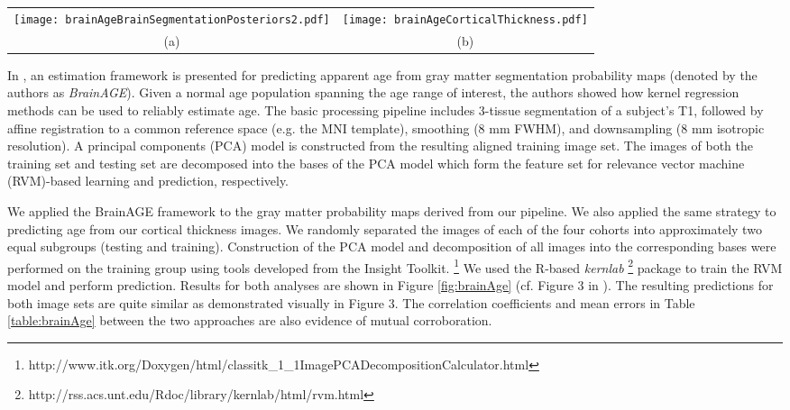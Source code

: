\begin{figure*}
  \centering
  \begin{tabular}{cc}
  \texttt{[image: brainAgeBrainSegmentationPosteriors2.pdf]} &
  \texttt{[image: brainAgeCorticalThickness.pdf]} \\
  (a) & (b) 
  \end{tabular}
  \caption{Results of RVM-based age prediction using (a) gray matter probability
  maps as in \cite{franke2010} and (b) cortical thickness maps both of which
  are derived from the previously described workflow.}
  \label{fig:brainAge}
\end{figure*}

In \cite{franke2010}, an estimation framework is presented for predicting 
apparent age from gray matter segmentation probability maps (denoted by the authors as {\it BrainAGE}).  
Given a normal age population spanning the age range of interest, the authors showed
how kernel regression methods can be used to reliably estimate age.  The basic processing pipeline includes 3-tissue segmentation
of a subject's T1, followed by affine registration to a common reference space (e.g.
the MNI template), smoothing (8 mm FWHM), and downsampling (8 mm 
isotropic resolution).  A principal components (PCA) model is constructed 
from the resulting aligned training image set.  The images of both the training set and 
testing set are decomposed into the bases of the PCA model which form the feature
set for relevance vector machine (RVM)-based learning and prediction, respectively. 

We applied the BrainAGE framework to the gray matter probability maps derived
from our pipeline.  We also applied the same strategy to predicting age from 
our cortical thickness images.  We randomly separated the images of each of the 
four cohorts into approximately two equal subgroups (testing and training).
Construction of the PCA model and decomposition of all images into the corresponding 
bases were performed on the training group using tools developed from the Insight Toolkit.%
\footnote{
http://www.itk.org/Doxygen/html/classitk\_1\_1ImagePCADecompositionCalculator.html  
}
We used the R-based {\it kernlab}%
\footnote{
http://rss.acs.unt.edu/Rdoc/library/kernlab/html/rvm.html
} 
package to train the RVM model and perform prediction.  Results for both
analyses  are shown in Figure \ref{fig:brainAge} (cf. Figure 3 in \cite{franke2010}).
The resulting predictions for both image sets are quite similar as demonstrated 
visually in Figure 3.  The correlation coefficients and mean errors in Table 
\ref{table:brainAge} between the
two approaches are also evidence of mutual corroboration.

